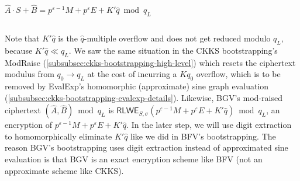 \begin{enumerate}
$\hat{A}\cdot S + \hat{B} = p^{\varepsilon-1}M + p^\varepsilon E + K'\hat{q} \bmod q_L$

$ $

Note that $K'\hat{q}$ is the $\hat{q}$-multiple overflow and does not get reduced modulo $q_L$, because $K'\hat{q} \ll q_L$. We saw the same situation in the CKKS bootstrapping's \textsf{ModRaise} (\autoref{subsubsec:ckks-bootstrapping-high-level}) which resets the ciphertext modulus from $q_0 \rightarrow q_L$ at the cost of incurring a $Kq_0$ overflow, which is to be removed by \textsf{EvalExp}'s homomorphic (approximate) sine graph evaluation (\autoref{subsubsec:ckks-bootstrapping-evalexp-details}). Likewise, BGV's mod-raised ciphertext $(\hat{A}, \hat{B}) \bmod q_L$ is $\textsf{RLWE}_{S, \sigma}(p^{\varepsilon-1}M + p^\varepsilon E + K'\hat{q}) \bmod q_L$, an encryption of $p^{\varepsilon-1}M + p^\varepsilon E + K'\hat{q}$. In the later step, we will use digit extraction to homomorphically eliminate $K'\hat{q}$ like we did in BFV's bootstrapping. The reason BGV's bootstrapping uses digit extraction instead of approximated sine evaluation is that BGV is an exact encryption scheme like BFV (not an approximate scheme like CKKS). 










\end{enumerate}
